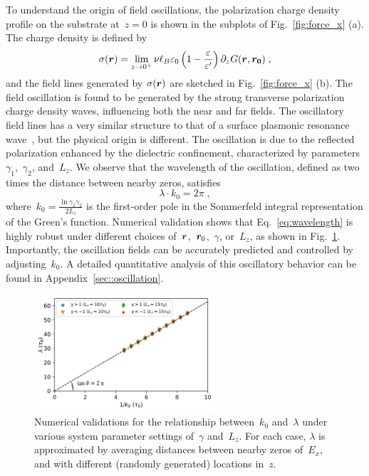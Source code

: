 To understand the origin of field oscillations, the polarization charge density profile on the substrate at~$z=0$ is shown in the subplots of Fig.~\ref{fig:force_x} (a). 
The charge density is defined by 
\begin{equation}
    \sigma(\boldsymbol{r}) = \lim_{z \to 0^+} \nu \ell_B \varepsilon_0  \left( 1 - \frac{\varepsilon}{\varepsilon'} \right) \partial_z G(\boldsymbol{r}, \boldsymbol{r_0})\;,
\end{equation}
and the field lines generated by $\sigma(\boldsymbol{r})$ are sketched in Fig.~\ref{fig:force_x} (b). 
The field oscillation is found to be generated by the strong transverse polarization charge density waves, influencing both the near and far fields. 
The oscillatory field lines has a very similar structure to that of a surface plasmonic resonance wave~\cite{willets2007localized}, but the physical origin is different. 
The oscillation is due to the reflected polarization enhanced by the dielectric confinement, characterized by parameters~$\gamma_1$,~$\gamma_2$, and~$L_z$.
We observe that the wavelength of the oscillation, defined as two times the distance between nearby zeros, satisfies 
\begin{equation}\label{eq:wavelength}
    \lambda \cdot k_0 = 2 \pi \;,
\end{equation}
where~$k_0 = \frac{\ln{\gamma_1 \gamma_2}}{2 L_z}$ is the first-order pole in the Sommerfeld integral representation of the Green's function.
Numerical validation shows that Eq.~\eqref{eq:wavelength} is highly robust under different choices of~$\boldsymbol{r}$,~$\boldsymbol{r}_0$,~$\gamma$, or~$L_z$, as shown in Fig.~\ref{fig:k_wavelegth}.
Importantly, the oscillation fields can be accurately predicted and controlled by adjusting~$k_0$. 
A detailed quantitative analysis of this oscillatory behavior can be found in Appendix~\ref{sec::oscillation}.

\begin{figure}[htbp]
    \centering
    \includegraphics[width=0.6\textwidth]{figs/fig3.pdf}
    \caption{
        Numerical validations for the relationship between~$k_0$ and~$\lambda$ under various system parameter settings of~$\gamma$ and~$L_z$. For each case, $\lambda$ is approximated by averaging distances between nearby zeros of~$E_x$, and with different (randomly generated) locations in~$z$. 
    }
    \label{fig:k_wavelegth}
\end{figure}
